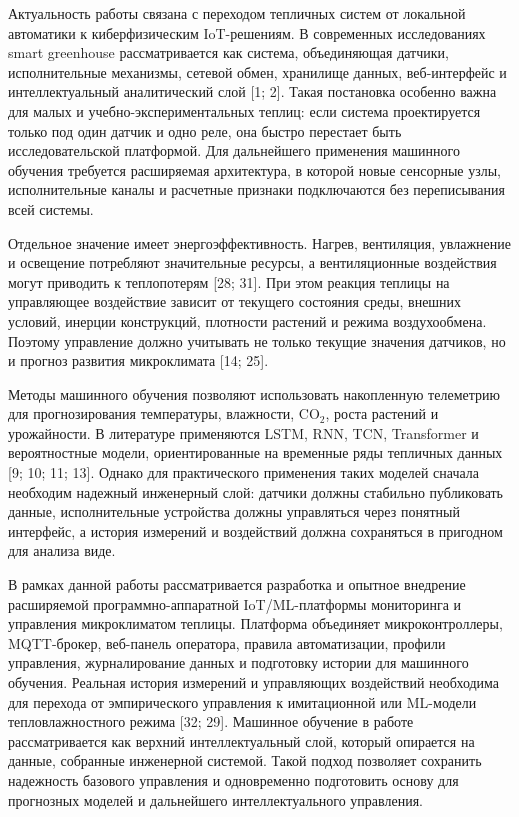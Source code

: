 \documentclass[a4paper,14pt]{extarticle}
\begin{document}
Актуальность работы связана с переходом тепличных систем от локальной
автоматики к киберфизическим IoT-решениям. В современных исследованиях
smart greenhouse рассматривается как система, объединяющая датчики,
исполнительные механизмы, сетевой обмен, хранилище данных, веб-интерфейс
и интеллектуальный аналитический слой {[}1; 2{]}. Такая постановка
особенно важна для малых и учебно-экспериментальных теплиц: если система
проектируется только под один датчик и одно реле, она быстро перестает
быть исследовательской платформой. Для дальнейшего применения машинного
обучения требуется расширяемая архитектура, в которой новые сенсорные
узлы, исполнительные каналы и расчетные признаки подключаются без
переписывания всей системы.

Отдельное значение имеет энергоэффективность. Нагрев, вентиляция,
увлажнение и освещение потребляют значительные ресурсы, а вентиляционные
воздействия могут приводить к теплопотерям {[}28; 31{]}. При этом
реакция теплицы на управляющее воздействие зависит от текущего состояния
среды, внешних условий, инерции конструкций, плотности растений и режима
воздухообмена. Поэтому управление должно учитывать не только текущие
значения датчиков, но и прогноз развития микроклимата {[}14; 25{]}.

Методы машинного обучения позволяют использовать накопленную телеметрию
для прогнозирования температуры, влажности, CO\(_2\), роста растений и
урожайности. В литературе применяются LSTM, RNN, TCN, Transformer и
вероятностные модели, ориентированные на временные ряды тепличных данных
{[}9; 10; 11; 13{]}. Однако для практического применения таких моделей
сначала необходим надежный инженерный слой: датчики должны стабильно
публиковать данные, исполнительные устройства должны управляться через
понятный интерфейс, а история измерений и воздействий должна сохраняться
в пригодном для анализа виде.

В рамках данной работы рассматривается разработка и опытное внедрение
расширяемой программно-аппаратной IoT/ML-платформы мониторинга и
управления микроклиматом теплицы. Платформа объединяет микроконтроллеры,
MQTT-брокер, веб-панель оператора, правила автоматизации, профили
управления, журналирование данных и подготовку истории для машинного
обучения. Реальная история измерений и управляющих воздействий
необходима для перехода от эмпирического управления к имитационной или
ML-модели тепловлажностного режима {[}32; 29{]}. Машинное обучение в
работе рассматривается как верхний интеллектуальный слой, который
опирается на данные, собранные инженерной системой. Такой подход
позволяет сохранить надежность базового управления и одновременно
подготовить основу для прогнозных моделей и дальнейшего
интеллектуального управления.
\end{document}
